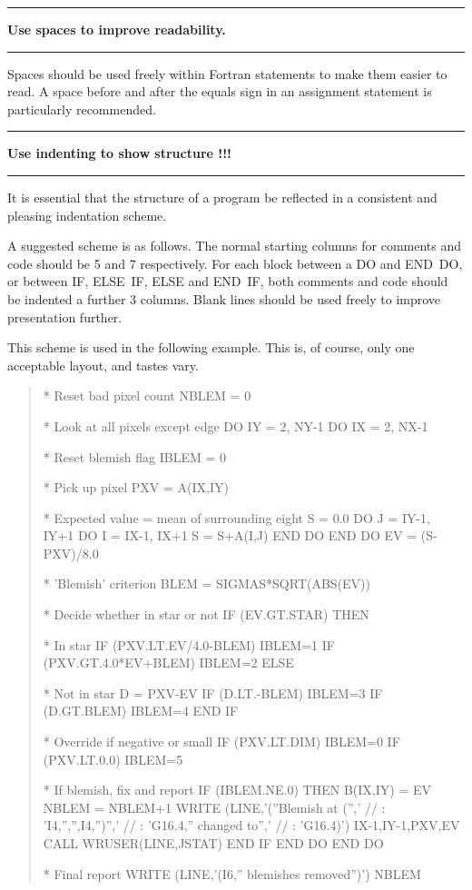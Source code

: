 \documentclass[twoside,11pt,nolof,noabs]{starlink}
\newcounter{sruleno}
\providecommand{\srule}[1]{
    \addtocounter{sruleno}{1}
    \goodbreak
    \rule{\textwidth}{0.3mm}
    \textbf{#1} \scpushright{ \textbf{\thesruleno}}
    \rule{\textwidth}{0.1mm}
}
\renewcommand{\_}{{\tt\char'137}}
\begin{document}
\srule{Use spaces to improve readability.}
Spaces should be used freely within Fortran statements
to make them easier to read.  A space before
and after the equals sign in an assignment statement is particularly
recommended.

\srule{Use indenting to show structure !!!}
It is essential that the structure of a program be reflected in a consistent and
pleasing indentation scheme.

A suggested scheme is as follows.
The normal starting columns for comments and code should be 5 and 7
respectively.
For each block between a DO and END~DO, or between IF, ELSE~IF,
ELSE and END~IF, both comments and
code should be indented a further 3 columns.
Blank lines should be used freely to improve presentation further.

\goodbreak
This scheme is used in the following example.  This is, of course,
only one acceptable layout, and tastes vary.
\begin{quote}
\begin{footnotesize}
\begin{terminalv}
*   Reset bad pixel count
      NBLEM = 0

*   Look at all pixels except edge
      DO IY = 2, NY-1
         DO IX = 2, NX-1

*         Reset blemish flag
            IBLEM = 0

*         Pick up pixel
            PXV = A(IX,IY)

*         Expected value = mean of surrounding eight
            S = 0.0
            DO J = IY-1, IY+1
               DO I = IX-1, IX+1
                  S = S+A(I,J)
               END DO
            END DO
            EV = (S-PXV)/8.0

*         'Blemish' criterion
            BLEM = SIGMAS*SQRT(ABS(EV))

*         Decide whether in star or not
            IF (EV.GT.STAR) THEN

*            In star
               IF (PXV.LT.EV/4.0-BLEM) IBLEM=1
               IF (PXV.GT.4.0*EV+BLEM) IBLEM=2
            ELSE

*            Not in star
               D = PXV-EV
               IF (D.LT.-BLEM) IBLEM=3
               IF (D.GT.BLEM) IBLEM=4
            END IF

*         Override if negative or small
            IF (PXV.LT.DIM) IBLEM=0
            IF (PXV.LT.0.0) IBLEM=5

*         If blemish, fix and report
            IF (IBLEM.NE.0) THEN
               B(IX,IY) = EV
               NBLEM = NBLEM+1
               WRITE (LINE,'(''Blemish at    ('','     //
     :                     'I4,'','',I4,'')'','        //
     :                     'G16.4,''  changed to'','   //
     :                     'G16.4)') IX-1,IY-1,PXV,EV
               CALL WRUSER(LINE,JSTAT)
            END IF
         END DO
      END DO

*   Final report
      WRITE (LINE,'(I6,''  blemishes removed'')') NBLEM
\end{terminalv}
\end{footnotesize}
\end{quote}
\end{document}
